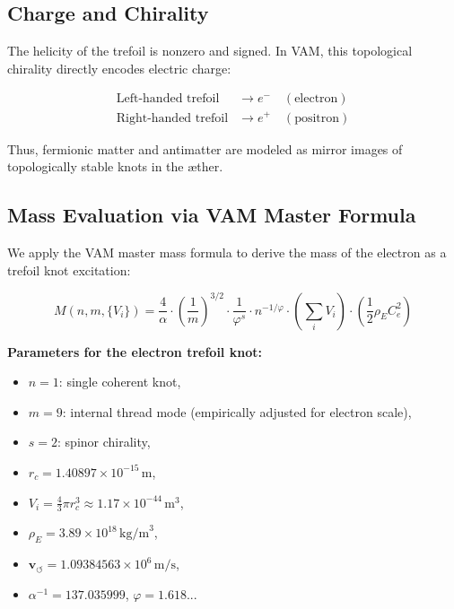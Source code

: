 \documentclass[preprint]{revtex4-2}
\begin{document}
\subsection{Charge and Chirality}

The helicity of the trefoil is nonzero and signed. In VAM, this topological chirality directly encodes electric charge:

\begin{align*}
\text{Left-handed trefoil} &\rightarrow e^- \quad (\text{electron}) \\
\text{Right-handed trefoil} &\rightarrow e^+ \quad (\text{positron})
\end{align*}

Thus, fermionic matter and antimatter are modeled as mirror images of topologically stable knots in the æther.

\subsection{Mass Evaluation via VAM Master Formula}

We apply the VAM master mass formula to derive the mass of the electron as a trefoil knot excitation:

\begin{equation}
\boxed{
M(n, m, \{V_i\}) = \frac{4}{\alpha} \cdot \left( \frac{1}{m} \right)^{3/2} \cdot \frac{1}{\varphi^s} \cdot n^{-1/\varphi} \cdot \left( \sum_i V_i \right) \cdot \left( \frac{1}{2} \rho_{\scriptscriptstyle\boldsymbol\!E}C_e^2 \right)
}
\end{equation}

\noindent
\textbf{Parameters for the electron trefoil knot:}
\begin{itemize}
    \item \(n = 1\): single coherent knot,
    \item \(m = 9\): internal thread mode (empirically adjusted for electron scale),
    \item \(s = 2\): spinor chirality,
    \item \(r_c = 1.40897 \times 10^{-15} \, \text{m}\),
    \item \(V_i = \frac{4}{3} \pi r_c^3 \approx 1.17 \times 10^{-44} \, \text{m}^3\),
    \item \(\rho_{\scriptscriptstyle\boldsymbol\!E}= 3.89 \times 10^{18} \, \text{kg/m}^3\),
    \item \(\mathbf{v}_{\scriptscriptstyle\boldsymbol{\circlearrowleft}} = 1.09384563 \times 10^6 \, \text{m/s}\),
    \item \(\alpha^{-1} = 137.035999\), \quad \(\varphi = 1.618...\)
\end{itemize}
\end{document}
